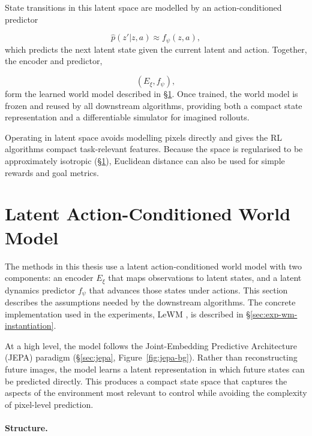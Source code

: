 State transitions in this latent space are modelled by an
action-conditioned predictor

\begin{equation}
\hat p(z'|z,a) \approx f_\psi(z,a),
\end{equation}
which predicts the next latent state given the current latent and
action. Together, the encoder and predictor,

\begin{equation}
(E_\xi,f_\psi),
\end{equation}
form the learned world model described in
\S\ref{sec:lewm-bg}. Once trained, the world model is frozen and reused
by all downstream algorithms, providing both a compact state
representation and a differentiable simulator for imagined rollouts.

Operating in latent space avoids modelling pixels directly and gives
the RL algorithms compact task-relevant features. Because the space is
regularised to be approximately isotropic (\S\ref{sec:lewm-bg}),
Euclidean distance can also be used for simple rewards and goal metrics.

\section{Latent Action-Conditioned World Model}
\label{sec:lewm-bg}

The methods in this thesis use a latent action-conditioned world model
with two components: an encoder $E_\xi$ that maps observations to latent
states, and a latent dynamics predictor $f_\psi$ that advances those
states under actions. This section describes the assumptions needed by
the downstream algorithms. The concrete implementation used in the
experiments, LeWM \cite{maes2026leworldmodelstableendtoendjointembedding},
is described in \S\ref{sec:exp-wm-instantiation}.

At a high level, the model follows the Joint-Embedding
Predictive Architecture (JEPA) paradigm
(\S\ref{sec:jepa}, Figure~\ref{fig:jepa-bg}). Rather
than reconstructing future images, the model learns a latent
representation in which future states can be predicted directly. This
produces a compact state space that captures the aspects of the
environment most relevant to control while avoiding the complexity of
pixel-level prediction.

\paragraph{Structure.}

